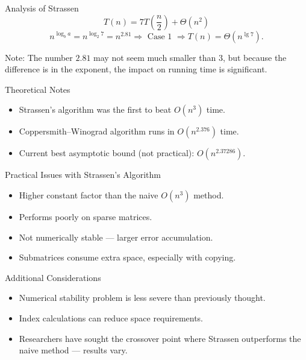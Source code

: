 \documentclass{beamer}
\begin{document}
\begin{frame}{Analysis of Strassen}
    $$
        T(n) = 7T\left(\frac{n}{2}\right) + \Theta(n^2)
    $$
    \pause
    $$
        n^{\log_b a} = n^{\log_2 7} = n^{2.81} \Longrightarrow \text{ Case 1 } \Longrightarrow T(n) = \Theta(n^{\lg 7}) \text{.}
    $$
    \pause
    \begin{exampleblock}{Note:}
        The number $2.81$ may not seem much smaller than $3$, but because the difference is in the exponent, the impact on running time is significant.
    \end{exampleblock}
\end{frame}

\begin{frame}{Theoretical Notes}
    \begin{itemize}
        \item Strassen’s algorithm was the first to beat $O(n^3)$ time.
        \item Coppersmith–Winograd algorithm runs in $O(n^{2.376})$ time.
        \item Current best asymptotic bound (not practical): $O(n^{2.37286})$.
    \end{itemize}
\end{frame}

\begin{frame}{Practical Issues with Strassen’s Algorithm}
    \begin{itemize}
        \item Higher constant factor than the naive $O(n^3)$ method.
        \item Performs poorly on sparse matrices.
        \item Not numerically stable — larger error accumulation.
        \item Submatrices consume extra space, especially with copying.
    \end{itemize}
\end{frame}

\begin{frame}{Additional Considerations}
    \begin{itemize}
        \item Numerical stability problem is less severe than previously thought.
        \item Index calculations can reduce space requirements.
        \item Researchers have sought the crossover point where Strassen outperforms the naive method — results vary.
    \end{itemize}
\end{frame}
\end{document}
